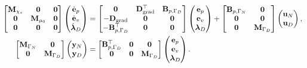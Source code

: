 \begin{equation}\label{eq:pHfindim_waves_phdae}
\begin{aligned}
\begin{bmatrix}
\mathbf{M}_{\chi_s} & \mathbf{0} & \mathbf{0}\\
\mathbf{0} & \mathbf{M}_{\mu_0} & \mathbf{0} \\
\mathbf{0} & \mathbf{0} & \mathbf{0} \\
\end{bmatrix}
\begin{pmatrix}
\dot{\mathbf{e}}_p\\
\dot{\mathbf{e}}_v\\
\dot{\bm{\lambda}}_D \\
\end{pmatrix}
&= \begin{bmatrix}
\mathbf{0} & \mathbf{D}_{\operatorname*{grad}}^\top & \mathbf{B}_{p, \Gamma_D}\\
-\mathbf{D}_{\operatorname*{grad}} & \mathbf{0} & \mathbf{0} \\
-\mathbf{B}_{p, \Gamma_D}^\top & \mathbf{0} & \mathbf{0} \\
\end{bmatrix}
\begin{pmatrix}
{\mathbf{e}}_p\\
{\mathbf{e}}_v\\
{\bm{\lambda}}_D \\
\end{pmatrix} + \begin{bmatrix}
\mathbf{B}_{p, \Gamma_N} & \mathbf{0}\\
\mathbf{0}& \mathbf{0}\\
\mathbf{0} & \mathbf{M}_{\Gamma_D} \\
\end{bmatrix}
\begin{pmatrix}
\mathbf{u}_N \\
\mathbf{u}_D \\
\end{pmatrix}, \\
\begin{bmatrix}
\mathbf{M}_{\Gamma_N} & \mathbf{0} \\
\mathbf{0} & \mathbf{M}_{\Gamma_D} \\
\end{bmatrix}
\begin{pmatrix}
\mathbf{y}_N \\
\mathbf{y}_D \\
\end{pmatrix} &=
\begin{bmatrix}
\mathbf{B}_{p, \Gamma_D}^\top & \mathbf{0} & \mathbf{0}\\ 
\mathbf{0} & \mathbf{0} & \mathbf{M}_{\Gamma_D} \\ 
\end{bmatrix}
\begin{pmatrix}
{\mathbf{e}}_p\\
{\mathbf{e}}_v\\
{\bm{\lambda}}_D \\
\end{pmatrix}.
\end{aligned}
\end{equation}
